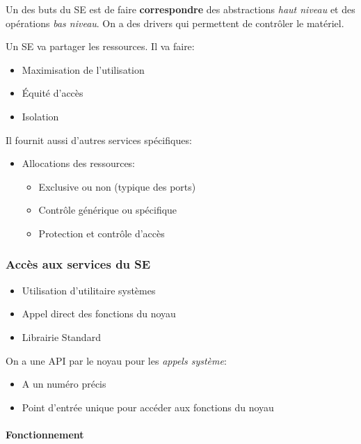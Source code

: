Un des buts du SE est de faire \textbf{correspondre} des abstractions
\emph{haut niveau} et des opérations \emph{bas niveau}. On a des drivers
qui permettent de contrôler le matériel.

Un SE va partager les ressources. Il va faire:

\begin{itemize}
\tightlist
\item
  Maximisation de l'utilisation
\item
  Équité d'accès
\item
  Isolation
\end{itemize}

Il fournit aussi d'autres services spécifiques:

\begin{itemize}
\tightlist
\item
  Allocations des ressources:

  \begin{itemize}
  \tightlist
  \item
    Exclusive ou non (typique des ports)
  \item
    Contrôle générique ou spécifique
  \item
    Protection et contrôle d'accès
  \end{itemize}
\end{itemize}

\subsubsection{Accès aux services du
SE}\label{accuxe8s-aux-services-du-se}

\begin{itemize}
\tightlist
\item
  Utilisation d'utilitaire systèmes
\item
  Appel direct des fonctions du noyau
\item
  Librairie Standard
\end{itemize}

On a une API par le noyau pour les \emph{appels système}:

\begin{itemize}
\tightlist
\item
  A un numéro précis
\item
  Point d'entrée unique pour accéder aux fonctions du noyau
\end{itemize}

\paragraph{Fonctionnement}\label{fonctionnement}

